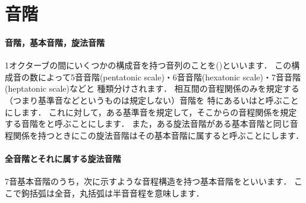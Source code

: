 \documentclass[dvipdfmx,uplatex,b5paper,openany,jbase=12Q,nomag*,textwidth-limit=44%
               ]{gachimuchi}
\begin{document}

\section{音階}%
\paragraph{音階，基本音階，旋法音階}
1オクターブの間にいくつかの構成音を持つ音列のことを\xkanjispace()といいます．
この構成音の数によって5音音階(pentatonic scale)・6音音階(hexatonic scale)・7音音階(heptatonic scale)などと
種類分けされます．
相互間の音程関係のみを規定する（つまり基準音などというものは規定しない）音階を
特にあるいはと呼ぶことにします．
これに対して，ある基準音を規定して，そこからの音程関係を規定する音階をと呼ぶことにします．
また，ある旋法音階がある基本音階と同じ音程関係を持つときにこの旋法音階はその基本音階に属すると呼ぶことにします．

\paragraph{全音階とそれに属する旋法音階}
7音基本音階のうち，次に示すような音程構造を持つ基本音階をといいます．
ここで鉤括弧は全音，丸括弧は半音音程を意味します．
\end{document}
